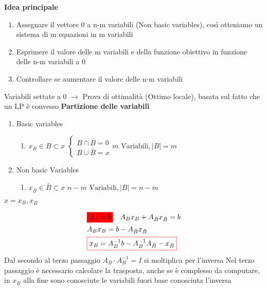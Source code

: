 \textbf{Idea principale}
\begin{enumerate}
    \item Assegnare il vettore 0 a n-m variabili (Non basic variables), così otteniamo un sistema di m equazioni in m variabili
    \item Esprimere il valore delle m variabili e della funzione obiettivo in funzione delle n-m variabili a 0
    \item Controllare se aumentare il valore delle n-m variabili
\end{enumerate}
Variabili settate a 0 $\rightarrow$ Prova di ottimalità (Ottimo locale), basata sul fatto che un LP è convesso
\textbf{Partizione delle variabili}
\begin{enumerate}
    \item Basic variables
    \begin{enumerate}
        \item $x_B \in B \subset x$ $\left\{\begin{array}{l}B \cap \bar{B}=0 \\B \cup \bar{B}=x\end{array}\right.$$m \text{ Variabili}, |B|=m$
    \end{enumerate}
    \item Non basic Variables
    \begin{enumerate}
        \item $x_{\bar{B}} \in \bar{B} \subset x$  $n-m \text{ Variabili}, |B|=n-m$
    \end{enumerate}
\end{enumerate}
$x=x_B, x_{\bar{B}}$

$$
\begin{aligned}
    & \colorbox{red}{$A_x=b$} \quad A_B x_B+A_{\bar{B}} x_{\bar{B}}=b \\
    & A_B x_B=b-A_{\bar{B}} x_{\bar{B}} \\
    & \fcolorbox{red}{white}{$x_B=A_B^{-1} b-A_B^{-1} A_{\bar{B}}-x_{\bar{B}}$}
\end{aligned}
$$
Dal secondo al terzo passaggio $A_B\cdot A_B^{-1}=I$ si moltiplica per l’inversa
Nel terzo passaggio è necessario calcolare la trasposta, anche se è complesso da computare, in $x_B$ alla fine sono conosciute le variabili fuori base conosciuta l’inversa

